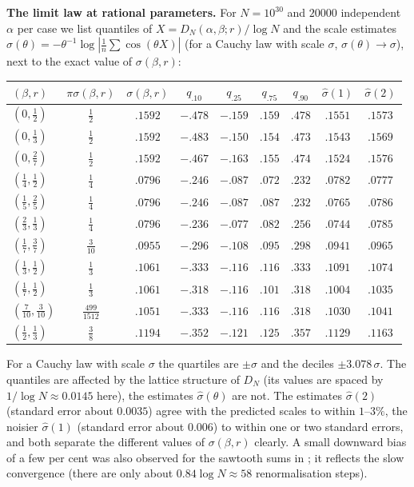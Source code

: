 \documentclass[11pt]{amsart}
\theoremstyle{definition}
\numberwithin{equation}{section}
\begin{document}
\smallskip\noindent\textbf{The limit law at rational parameters.} For $N=10^{30}$ and $20000$ independent $\alpha$ per case we list quantiles of
$X=D_N(\alpha,\beta;r)/\log N$ and the scale estimates $\hat\sigma(\theta)=-\theta^{-1}\log|\frac1n\sum\cos(\theta X)|$ (for a Cauchy law with scale $\sigma$,
$\hat\sigma(\theta)\to\sigma$), next to the exact value of $\sigma(\beta,r)$:
\begin{center}\small
\begin{tabular}{lcccccccc}\toprule
$(\beta,r)$ & $\pi\sigma(\beta,r)$ & $\sigma(\beta,r)$ & $q_{.10}$ & $q_{.25}$ & $q_{.75}$ & $q_{.90}$ & $\hat\sigma(1)$ & $\hat\sigma(2)$\\\midrule
$(0,\frac12)$ & $\frac12$ & $.1592$ & $-.478$ & $-.159$ & $.159$ & $.478$ & $.1551$ & $.1573$\\
$(0,\frac13)$ & $\frac12$ & $.1592$ & $-.483$ & $-.150$ & $.154$ & $.473$ & $.1543$ & $.1569$\\
$(0,\frac27)$ & $\frac12$ & $.1592$ & $-.467$ & $-.163$ & $.155$ & $.474$ & $.1524$ & $.1576$\\
$(\frac14,\frac12)$ & $\frac14$ & $.0796$ & $-.246$ & $-.087$ & $.072$ & $.232$ & $.0782$ & $.0777$\\
$(\frac15,\frac25)$ & $\frac14$ & $.0796$ & $-.246$ & $-.087$ & $.087$ & $.232$ & $.0765$ & $.0786$\\
$(\frac23,\frac13)$ & $\frac14$ & $.0796$ & $-.236$ & $-.077$ & $.082$ & $.256$ & $.0744$ & $.0785$\\
$(\frac17,\frac37)$ & $\frac3{10}$ & $.0955$ & $-.296$ & $-.108$ & $.095$ & $.298$ & $.0941$ & $.0965$\\
$(\frac13,\frac12)$ & $\frac13$ & $.1061$ & $-.333$ & $-.116$ & $.116$ & $.333$ & $.1091$ & $.1074$\\
$(\frac17,\frac12)$ & $\frac13$ & $.1061$ & $-.318$ & $-.116$ & $.101$ & $.318$ & $.1004$ & $.1035$\\
$(\frac7{10},\frac3{10})$ & $\frac{499}{1512}$ & $.1051$ & $-.333$ & $-.116$ & $.116$ & $.318$ & $.1030$ & $.1041$\\
$(\frac12,\frac13)$ & $\frac38$ & $.1194$ & $-.352$ & $-.121$ & $.125$ & $.357$ & $.1129$ & $.1163$\\\bottomrule
\end{tabular}
\end{center}
For a Cauchy law with scale $\sigma$ the quartiles are $\pm\sigma$ and the deciles $\pm3.078\,\sigma$. The quantiles are affected by the lattice
structure of $D_N$ (its values are spaced by $1/\log N\approx0.0145$ here), the estimates $\hat\sigma(\theta)$ are not. The estimates $\hat\sigma(2)$
(standard error about $0.0035$) agree with the predicted scales to within $1$--$3\%$, the noisier $\hat\sigma(1)$ (standard error about $0.006$) to
within one or two standard errors, and both separate the different values of $\sigma(\beta,r)$ clearly. A small downward bias of a few per cent
was also observed for the sawtooth sums in \cite{E1002}; it reflects the slow convergence (there are only about $0.84\log N\approx58$
renormalisation steps).
\end{document}
